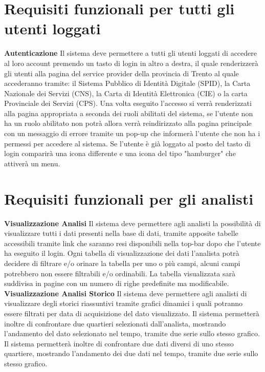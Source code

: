     \section{Requisiti funzionali per tutti gli utenti loggati}
        \begin{rfList}
            \rfItem \textbf{Autenticazione} Il sistema deve permettere a tutti gli utenti loggati di accedere al loro account premendo un tasto di login in altro a destra, il quale renderizzerà gli utenti alla pagina del service provider della provincia di Trento al quale accederanno tramite: il Sistema Pubblico di Identità Digitale (SPID), la Carta Nazionale dei Servizi (CNS), la Carta di Identità Elettronica (CIE) o la carta Provinciale dei Servizi (CPS). Una volta eseguito l'accesso si verrà renderizzati alla pagina appropriata a seconda dei ruoli abilitati del sistema, se l'utente non ha un ruolo abilitato non potrà allora verrà reindirizzato alla pagina principale con un messaggio di errore tramite un pop-up che informerà l'utente che non ha i permessi per accedere al sistema. Se l'utente è già loggato al posto del tasto di login comparirà una icona differente e una icona del tipo "hamburger" che attiverà un menu.
        \end{rfList}
    \section{Requisiti funzionali per gli analisti}
        \begin{rfList}
            \rfItem \textbf{Visualizzazione Analisi} Il sistema deve permettere agli analisti la possibilità di visualizzare tutti i dati presenti nella base di dati, tramite apposite tabelle accessibili tramite link che saranno resi disponibili nella top-bar dopo che l'utente ha eseguito il login. Ogni tabella di visualizzazione dei dati l'analista potrà decidere di filtrare e/o orinare la tabella per uno o più campi, alcuni campi potrebbero non essere filtrabili e/o ordinabili. La tabella visualizzata sarà suddivisa in pagine con un numero di righe predefinite ma modificabile.
            \rfItem \textbf{Visualizzazione Analisi Storico} Il sistema deve permettere agli analisti di visualizzare degli storici riassuntivi tramite grafici dinamici i quali potranno essere filtrati per data di acquisizione del dato visualizzato. Il sistema permetterà inoltre di confrontare due quartieri selezionati dall'analista, mostrando l'andamento del dato selezionato nel tempo, tramite due serie sullo stesso grafico. Il sistema permetterà inoltre di confrontare due dati diversi di uno stesso quartiere, mostrando l'andamento dei due dati nel tempo, tramite due serie sullo stesso grafico. 
        \end{rfList}
